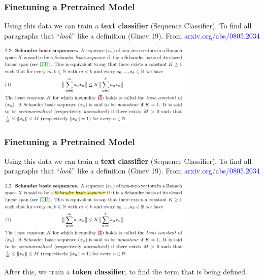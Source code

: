 \documentclass[10pt]{beamer}
\begin{document}
\begin{frame}[fragile]
\begin{itemize}
\begin{columns}
\begin{column}{0.6\textwidth}
        \end{column}
    \end{columns}

\end{itemize}
\end{frame}


\begin{frame}
    \frametitle{Finetuning a Pretrained Model}
    Using this data we can train a \textbf{text classifier} (Sequence Classifier). To find all paragraphs that ``\textit{look}'' like a definition (Ginev 19). \pause From \textcolor{blue}{arxiv.org/abs/0805.2034}
    \begin{center}
        \includegraphics[width=0.7\textwidth]{../Images/def2.png}
    \end{center}
\end{frame}

\begin{frame}
    \frametitle{Finetuning a Pretrained Model}
    Using this data we can train a \textbf{text classifier} (Sequence Classifier). To find all paragraphs that ``\textit{look}'' like a definition (Ginev 19). From \textcolor{blue}{arxiv.org/abs/0805.2034}
    \begin{center}
        \includegraphics[width=0.7\textwidth]{../Images/def_highlighted.png}
    \end{center}
 After this, we train a \textbf{token classifier}, to find the term that is being defined.
\end{frame}
\end{document}
